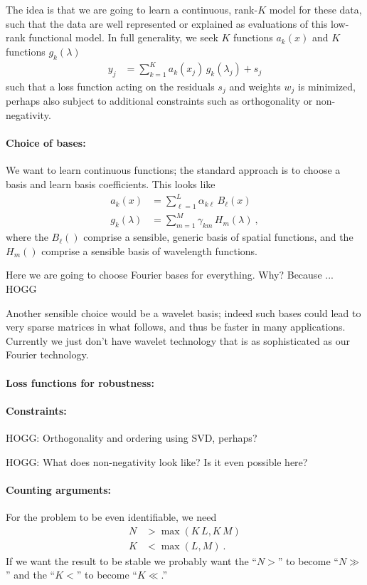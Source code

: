 \documentclass{article}
\begin{document}
The idea is that we are going to learn a continuous, rank-$K$ model for these data, such that the data are well represented or explained as evaluations of this low-rank functional model.
In full generality, we seek $K$ functions $a_k(x)$ and $K$ functions $g_k(\lambda)$
\begin{align}
    y_j &= \sum_{k=1}^K a_k(x_j)\,g_k(\lambda_j) + s_j
\end{align}
such that a loss function acting on the residuals $s_j$ and weights $w_j$ is minimized, perhaps also subject to additional constraints such as orthogonality or non-negativity.

\paragraph{Choice of bases:}
We want to learn continuous functions; the standard approach is to choose a basis and learn basis coefficients.
This looks like
\begin{align}
    a_k(x) &= \sum_{\ell=1}^L \alpha_{k\ell}\,B_\ell(x) \\
    g_k(\lambda) &= \sum_{m=1}^M \gamma_{km}\,H_m(\lambda) ~,
\end{align}
where the $B_\ell()$ comprise a sensible, generic basis of spatial functions,
and the $H_m()$ comprise a sensible basis of wavelength functions.

Here we are going to choose Fourier bases for everything.
Why? Because ... HOGG

Another sensible choice would be a wavelet basis; indeed such bases could lead to very sparse matrices in what follows, and thus be faster in many applications.
Currently we just don't have wavelet technology that is as sophisticated as our Fourier technology.

\paragraph{Loss functions for robustness:}

\paragraph{Constraints:}
HOGG: Orthogonality and ordering using SVD, perhaps?

HOGG: What does non-negativity look like? Is it even possible here?

\paragraph{Counting arguments:}
For the problem to be even identifiable, we need
\begin{align}
    N &> \max(K\,L, K\,M) \\
    K &< \max(L, M) ~.
\end{align}
If we want the result to be stable we probably want the ``$N>$'' to become ``$N\gg$'' and the ``$K<$'' to become ``$K\ll$.''
\end{document}
